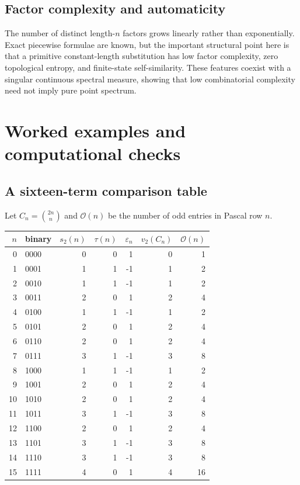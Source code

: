 \documentclass[11pt,oneside]{article}
\theoremstyle{definition}
\theoremstyle{remark}
\newcommand{\vtwo}{v_2}
\newcommand{\bitsum}{s_2}
\newcommand{\eps}{\varepsilon}
\begin{document}
\subsection{Factor complexity and automaticity}

The number of distinct length-$n$ factors grows linearly rather than
exponentially.  Exact piecewise formulae are known, but the important
structural point here is that a primitive constant-length substitution has
low factor complexity, zero topological entropy, and finite-state
self-similarity.  These features coexist with a singular continuous spectral
measure, showing that low combinatorial complexity need not imply pure point
spectrum.

\section{Worked examples and computational checks}

\subsection{A sixteen-term comparison table}

Let $C_n=\binom{2n}{n}$ and $\mathcal O(n)$ be the number of odd entries in
Pascal row $n$.

\begin{center}
\small
\begin{tabular}{r@{\quad}lrrrrr}
\toprule
$n$ & binary & $\bitsum(n)$ & $\tau(n)$ & $\eps_n$ & $\vtwo(C_n)$ & $\mathcal O(n)$\\
\midrule
0  & 0000 & 0 & 0 &  1 & 0 & 1\\
1  & 0001 & 1 & 1 & -1 & 1 & 2\\
2  & 0010 & 1 & 1 & -1 & 1 & 2\\
3  & 0011 & 2 & 0 &  1 & 2 & 4\\
4  & 0100 & 1 & 1 & -1 & 1 & 2\\
5  & 0101 & 2 & 0 &  1 & 2 & 4\\
6  & 0110 & 2 & 0 &  1 & 2 & 4\\
7  & 0111 & 3 & 1 & -1 & 3 & 8\\
8  & 1000 & 1 & 1 & -1 & 1 & 2\\
9  & 1001 & 2 & 0 &  1 & 2 & 4\\
10 & 1010 & 2 & 0 &  1 & 2 & 4\\
11 & 1011 & 3 & 1 & -1 & 3 & 8\\
12 & 1100 & 2 & 0 &  1 & 2 & 4\\
13 & 1101 & 3 & 1 & -1 & 3 & 8\\
14 & 1110 & 3 & 1 & -1 & 3 & 8\\
15 & 1111 & 4 & 0 &  1 & 4 & 16\\
\bottomrule
\end{tabular}
\end{center}
\end{document}
